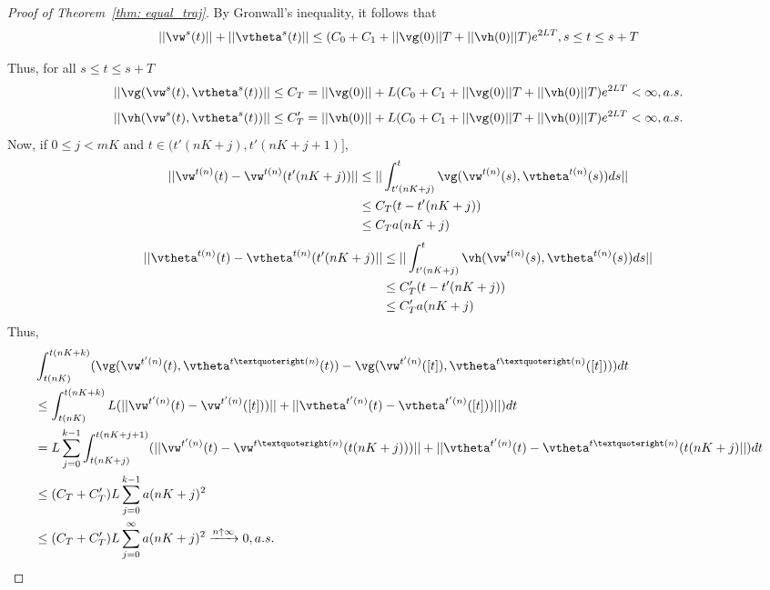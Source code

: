 \documentclass{article}
\def\thmref#1{Theorem~\ref{#1}}
\begin{document}
\begin{proof}[Proof of \thmref{thm: equal_traj}]
		By Gronwall's inequality, it follows that 
		\begin{equation}
		||\vw^s(t)||+||\vtheta^s(t)||\leq (C_0+C_1+||\vg(0)||T+||\vh(0)||T)e^{2LT}, s\leq t\leq s+T
		\end{equation}
		
		Thus, for all $s\leq t\leq s+T$
		\begin{equation}
		||\vg(\vw^s(t), \vtheta^s(t))||\leq C_T = ||\vg(0)||+L(C_0+C_1+||\vg(0)||T+||\vh(0)||T)e^{2LT}<\infty, a.s.
		\end{equation}
		\begin{equation}
		||\vh(\vw^s(t), \vtheta^s(t))||\leq C'_T = ||\vh(0)||+L(C_0+C_1+||\vg(0)||T+||\vh(0)||T)e^{2LT}<\infty, a.s.
		\end{equation}
		Now, if $0 \leq j< mK$ and $t\in (t'(nK+j),t'(nK+j+1)]$,
		\begin{equation}
		\begin{split}
		|| \vw^{t(n)}(t)- \vw^{t(n)}(t'(nK+j))|| &\leq ||\int_{t'(nK+j)}^t \vg(\vw^{t(n)}(s), \vtheta^{t(n)}(s))ds||\\
		&\leq C_T(t-t'(nK+j))\\
		&\leq C_Ta(nK+j) 
		\end{split}
		\end{equation}
		\begin{equation}
		\begin{split}
		|| \vtheta^{t(n)}(t)- \vtheta^{t(n)}(t'(nK+j)|| &\leq ||\int_{t'(nK+j)}^t \vh(\vw^{t(n)}(s), \vtheta^{t(n)}(s))ds||\\
		&\leq C'_T(t-t'(nK+j))\\
		&\leq C'_Ta(nK+j)
		\end{split}
		\end{equation}
		Thus,
		\begin{equation}
		\begin{split}
		&\int_{t(nK)}^{t(nK+k)}(\vg( \vw^{t'(n)}(t),\vtheta^{t’(n)}(t))-\vg( \vw^{t'(n)}([t]),\vtheta^{t’(n)}([t])))dt\\
		&\leq\int_{t(nK)}^{t(nK+k)}L(||\vw^{t'(n)}(t)-\vw^{t'(n)}([t]))||+||\vtheta^{t'(n)}(t)-\vtheta^{t'(n)}([t]))||)dt\\
		&=L \sum_{j=0}^{k-1} \int_{t(nK+j)}^{t(nK+j+1)}(||\vw^{t'(n)}(t)-\vw^{t’(n)}(t(nK+j)))|| +|| \vtheta^{t'(n)}(t)- \vtheta^{t’(n)}(t(nK+j)||)dt\\
		&\leq (C_T+C'_T) L\sum_{j=0}^{k-1} a(nK+j) ^2 \\
		&\leq (C_T+C'_T) L\sum_{j=0}^{\infty} a(nK+j) ^2  \xrightarrow{n \uparrow \infty }0, a.s.
		\end{split}
		\end{equation}
		

\end{proof}
\end{document}
